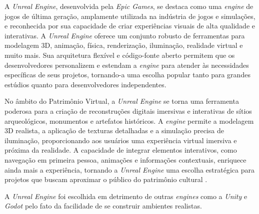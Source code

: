     A \textit{Unreal Engine}, desenvolvida pela \textit{Epic Games}, se destaca como uma \textit{engine} de jogos de última geração, amplamente utilizada na indústria de jogos e simulações, e reconhecida por sua capacidade de criar experiências visuais de alta qualidade e interativas.  A \textit{Unreal Engine} oferece um conjunto robusto de ferramentas para modelagem 3D, animação, física, renderização, iluminação, realidade virtual e muito mais. Sua arquitetura flexível e código-fonte aberto permitem que os desenvolvedores personalizem e estendam a \textit{engine} para atender às necessidades específicas de seus projetos, tornando-a uma escolha popular tanto para grandes estúdios quanto para desenvolvedores independentes.
    
    No âmbito do Patrimônio Virtual, a \textit{Unreal Engine} se torna uma ferramenta poderosa para a criação de reconstruções digitais imersivas e interativas de sítios arqueológicos, monumentos e artefatos históricos. A \textit{engine} permite a modelagem 3D realista, a aplicação de texturas detalhadas e a simulação precisa de iluminação, proporcionando aos usuários uma experiência virtual imersiva e próxima da realidade. A capacidade de integrar elementos interativos, como navegação em primeira pessoa, animações e informações contextuais, enriquece ainda mais a experiência, tornando a \textit{Unreal Engine} uma escolha estratégica para projetos que buscam aproximar o público do patrimônio cultural \citep{silva2022realidade}. 
    
    A \textit{Unreal Engine} foi escolhida em detrimento de outras \textit{engines} como a \textit{Unity} e \textit{Godot} pelo fato da facilidade de se construir ambientes realistas.
    
